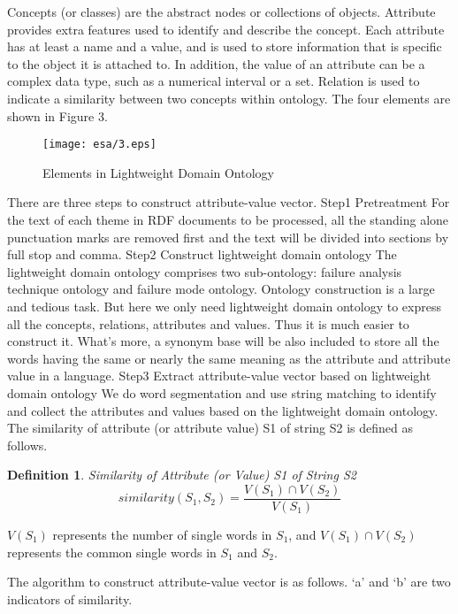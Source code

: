 \documentclass{elsarticle}
\newtheorem{definition}{Definition}
\begin{document}
Concepts (or classes) are the abstract nodes or collections of objects. Attribute provides extra features used to identify and describe the concept. Each attribute has at least a name and a value, and is used to store information that is specific to the object it is attached to. In addition, the value of an attribute can be a complex data type, such as a numerical interval or a set. Relation is used to indicate a similarity between two concepts within ontology. The four elements are shown in Figure 3.
\begin{figure}[htb]
  \centering
  \texttt{[image: esa/3.eps]}
  \caption{Elements in Lightweight Domain Ontology}
\end{figure}
There are three steps to construct attribute-value vector.
Step1 Pretreatment
For the text of each theme in RDF documents to be processed, all the standing alone punctuation marks are removed first and the text will be divided into sections by full stop and comma.
Step2 Construct lightweight domain ontology 
The lightweight domain ontology comprises two sub-ontology: failure analysis technique ontology and failure mode ontology. Ontology construction is a large and tedious task. But here we only need lightweight domain ontology to express all the concepts, relations, attributes and values. Thus it is much easier to construct it. What’s more, a synonym base will be also included to store all the words having the same or nearly the same meaning as the attribute and attribute value in a language.
Step3 Extract attribute-value vector based on lightweight domain ontology
We do word segmentation and use string matching to identify and collect the attributes and values based on the lightweight domain ontology. The similarity of attribute (or attribute value) S1 of string S2 is defined as follows.
\begin{definition}
  Similarity of Attribute (or Value) S1 of String
  S2 \[similarity(S_1,S_2) = \frac{V(S_1) \cap V(S_2)}{V(S_1)} \]

\end{definition}

$V(S_1)$ represents the number of single words in $S_1$, and $V(S_1)
\cap V(S_2)$ represents the common single words in $S_1$ and $S_2$.

The algorithm to construct attribute-value vector is as follows. ‘a’ and ‘b’ are two indicators of similarity.
\end{document}
